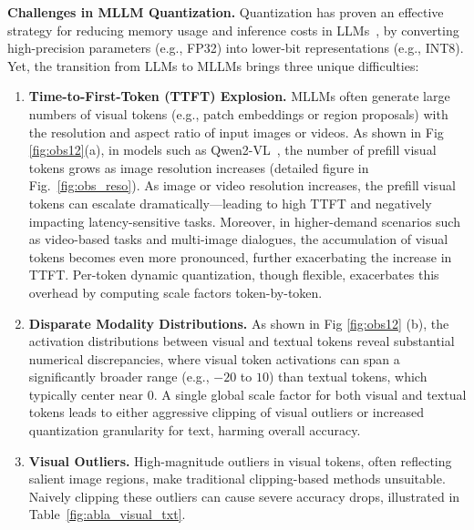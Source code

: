 \textbf{Challenges in MLLM Quantization.} Quantization has proven an effective strategy for reducing memory usage
and inference costs in LLMs~\citep{yuan2023rptq,2023omniquant}, by converting high-precision parameters (e.g., FP32)
into lower-bit representations (e.g., INT8). Yet, the transition from LLMs to MLLMs brings three unique difficulties:
\vspace{-4mm}
\begin{enumerate}[leftmargin=1.2em,itemsep=2pt,parsep=1pt]
    \item \textbf{Time-to-First-Token (TTFT) Explosion.} MLLMs often generate large numbers of visual tokens (e.g.,
    patch embeddings or region proposals) with the resolution and aspect ratio of input images or videos. As shown in Fig \ref{fig:obs12}(a), in models such as Qwen2-VL~\citep{Qwen2VL}, the number of prefill visual tokens grows as image resolution increases (detailed figure in Fig.~\ref{fig:obs_reso}). As image or video resolution increases, the prefill visual tokens can
    escalate dramatically---leading to high TTFT and negatively impacting latency-sensitive tasks. Moreover, in higher-demand scenarios such as video-based tasks and multi-image dialogues, the accumulation of visual tokens becomes even more pronounced, further exacerbating the increase in TTFT. Per-token dynamic
    quantization, though flexible, exacerbates this overhead by computing scale factors token-by-token.
    
    \item \textbf{Disparate Modality Distributions.} As shown in Fig \ref{fig:obs12} (b), the activation distributions between visual and textual tokens reveal substantial numerical discrepancies, where visual token activations can span a significantly broader range
    (e.g., $-20$ to $10$) than textual tokens, which typically center near $0$. A single global scale factor for both visual
    and textual tokens leads to either aggressive clipping of visual outliers or increased quantization granularity for text, harming
    overall accuracy.
    
    \item \textbf{Visual Outliers.} High-magnitude outliers in visual tokens, often reflecting salient image regions,
    make traditional clipping-based methods unsuitable. Naively clipping these outliers can cause severe accuracy drops,
    illustrated in Table~\ref{fig:abla_visual_txt}.
\end{enumerate}

